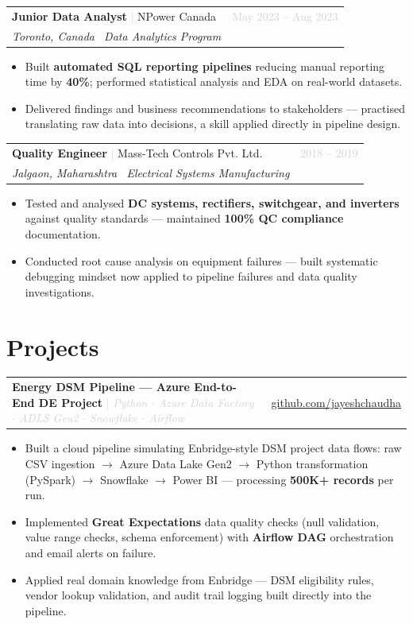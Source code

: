 \documentclass[10pt, a4paper]{article}
\makeatletter
\newcommand{\jobentry}[4]{%
    \noindent
    \begin{tabularx}{\linewidth}{@{}X r@{}}
        {\bfseries\color{darkgray} #1} \textcolor{lightgray}{|}
        \textcolor{accent}{#2} & \textcolor{lightgray}{\small #3} \\
        \textcolor{midgray}{\small\itshape #4} & \\
    \end{tabularx}\vspace{2pt}
}
\newcommand{\projectentry}[3]{%
    \noindent
    \begin{tabularx}{\linewidth}{@{}X r@{}}
        {\bfseries\color{darkgray} #1}
        \textcolor{lightgray}{\small | \textit{#2}}
        & \textcolor{accent}{\small\faGithub\
          \href{#3}{github.com/jayeshchaudha}} \\
    \end{tabularx}\vspace{2pt}
}
\makeatother
\begin{document}
\vspace{3pt}

\jobentry{Junior Data Analyst}{NPower Canada}{May 2023 -- Aug 2023}%
    {Toronto, Canada \textbar\ Data Analytics Program}

\begin{itemize}
    \item Built \textbf{automated SQL reporting pipelines} reducing manual reporting time by
    \textbf{40\%}; performed statistical analysis and EDA on real-world datasets.
    \item Delivered findings and business recommendations to stakeholders --- practised
    translating raw data into decisions, a skill applied directly in pipeline design.
\end{itemize}

\vspace{3pt}

\jobentry{Quality Engineer}{Mass-Tech Controls Pvt. Ltd.}{2018 -- 2019}%
    {Jalgaon, Maharashtra \textbar\ Electrical Systems Manufacturing}

\begin{itemize}
    \item Tested and analysed \textbf{DC systems, rectifiers, switchgear, and inverters} against
    quality standards --- maintained \textbf{100\% QC compliance} documentation.
    \item Conducted root cause analysis on equipment failures --- built systematic debugging
    mindset now applied to pipeline failures and data quality investigations.
\end{itemize}

\section{Projects}

\projectentry{Energy DSM Pipeline --- Azure End-to-End DE Project}%
    {Python $\cdot$ Azure Data Factory $\cdot$ ADLS Gen2 $\cdot$ Snowflake $\cdot$ Airflow}%
    {https://github.com/jayeshchaudha/energy-dsm-pipeline}

\begin{itemize}
    \item Built a cloud pipeline simulating Enbridge-style DSM project data flows:
    raw CSV ingestion $\rightarrow$ Azure Data Lake Gen2 $\rightarrow$ Python transformation
    (PySpark) $\rightarrow$ Snowflake $\rightarrow$ Power BI --- processing \textbf{500K+
    records} per run.
    \item Implemented \textbf{Great Expectations} data quality checks (null validation, value
    range checks, schema enforcement) with \textbf{Airflow DAG} orchestration and email
    alerts on failure.
    \item Applied real domain knowledge from Enbridge --- DSM eligibility rules, vendor
    lookup validation, and audit trail logging built directly into the pipeline.
\end{itemize}
\end{document}
